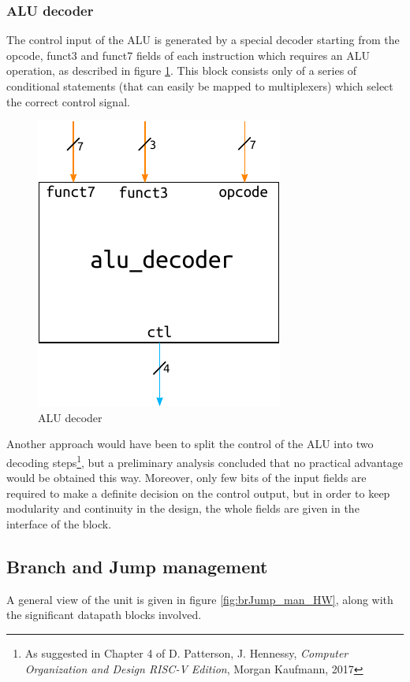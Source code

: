 \documentclass[a4paper]{article}
\begin{document}
\subsubsection{ALU decoder}
The control input of the ALU is generated by a special decoder starting from the opcode, funct3 and funct7 fields of each instruction which requires an ALU operation, as described in figure \ref{fig:alu_dec}. This block consists only of a series of conditional statements (that can easily be mapped to multiplexers) which select the correct control signal.

\begin{figure}[hbtp]
    \centering
    \includegraphics[]{../alu/ref/schematic/alu_dec.pdf}
    \caption{ALU decoder}
    \label{fig:alu_dec}
\end{figure}

Another approach would have been to split the control of the ALU into two decoding steps\footnote{As suggested in Chapter 4 of D. Patterson, J. Hennessy, \emph{Computer Organization and Design RISC-V Edition}, Morgan Kaufmann, 2017}, but a preliminary analysis concluded that no practical advantage would be obtained this way.
Moreover, only few bits of the input fields are required to make a definite decision on the control output, but in order to keep modularity and continuity in the design, the whole fields are given in the interface of the block.

\subsection{Branch and Jump management}
A general view of the unit is given in figure \ref{fig:brJump_man_HW}, along with the significant datapath blocks involved.
\end{document}
